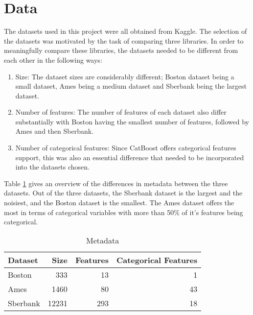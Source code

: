 \section{Data}
\label{sec:data}
The datasets used in this project were all obtained from Kaggle. The selection of the datasets was motivated by the task of comparing three libraries. In order to meaningfully compare these libraries, the datasets needed to be different from each other in the following ways: 
\begin{enumerate}
\item Size: The dataset sizes are considerably different; Boston dataset being a small dataset, Ames being a medium dataset and Sberbank being the largest dataset.
\item Number of features: The number of features of each dataset also differ substantially with Boston having the smallest number of features, followed by Ames and then Sberbank.
\item Number of categorical features: Since CatBoost offers categorical features support, this was also an essential difference that needed to be incorporated into the datasets chosen.
\end{enumerate}

Table \ref{metadata} gives an overview of the differences in metadata between the three datasets. Out of the three datasets, the Sberbank dataset is the largest and the noisiest, and the Boston dataset is the smallest. The Ames dataset offers the most in terms of categorical variables with more than 50\% of it's features being categorical.


\begin{table}[tbp]
\centering
\begin{tabular}{|l|r|r|r|}
\hline
Dataset  & Size  & Features & Categorical Features \\ \hline
Boston   & 333   & 13       & 1                    \\ \hline
Ames     & 1460  & 80       & 43                   \\ \hline
Sberbank & 12231 & 293      & 18                   \\ \hline
\end{tabular}
\caption{Metadata}
\label{metadata}
\end{table}